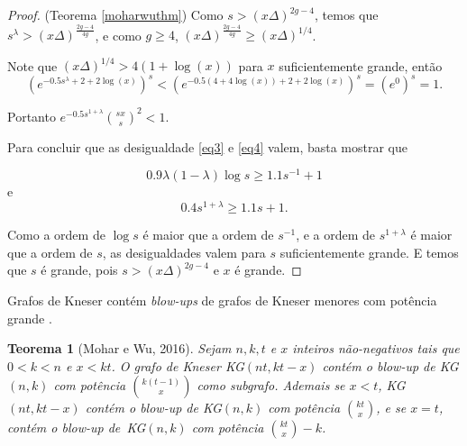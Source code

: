 \documentclass{article}
\newtheorem{teorema}{Teorema}[section]
\begin{document}
\begin{proof}{(Teorema \ref{moharwuthm})}
Como $s > (x\Delta)^{2g-4}$, temos que $s^\lambda > (x\Delta)^{\frac{2g-4}{4g}}$, e como $g \geq 4$, $(x\Delta)^{\frac{2g-4}{4g}} \geq (x\Delta)^{1/4}$. 

Note que $(x\Delta)^{1/4} > 4(1+\log(x))$ para $x$ suficientemente grande, então \[\left(e^{-0.5s^\lambda + 2 + 2\log(x)}\right)^s < \left(e^{-0.5(4+4\log(x)) + 2 + 2\log(x)}\right)^s = (e^0)^s = 1.\]

Portanto $e^{-0.5s^{1+\lambda}}\binom{sx}{s}^2 < 1$.

Para concluir que as desigualdade \ref{eq3} e \ref{eq4} valem, basta mostrar que

\[0.9\lambda(1-\lambda)\log s \geq 1.1s^{-1} + 1\]
e
\[0.4s^{1+\lambda}\geq 1.1s + 1.\]

Como a ordem de $\log s$ é maior que a ordem de $s^{-1}$, e a ordem de $s^{1+\lambda}$ é maior que a ordem de $s$, as desigualdades valem para $s$ suficientemente grande. E temos que $s$ é grande, pois $s > (x\Delta)^{2g-4}$ e $x$ é grande.
\end{proof}

Grafos de Kneser contém \textit{blow-ups} de grafos de Kneser menores com potência grande \cite{mohar2016dichromatic}.

\begin{teorema}[Mohar e Wu, 2016]\label{moharwukn}
Sejam $n,k,t$ e $x$ inteiros não-negativos tais que $0 < k < n$ e $x < kt$. O grafo de Kneser KG$(nt, kt-x)$ contém o \textit{blow-up} de KG$(n,k)$ com potência $\binom{k(t-1)}{x}$ como subgrafo. Ademais se $x < t$, KG$(nt, kt-x)$ contém o \textit{blow-up} de KG$(n,k)$ com potência $\binom{kt}{x}$, e se $x = t$, contém o \textit{blow-up} de~KG$(n,k)$ com potência $\binom{kt}{x}-k$.
\end{teorema}
\end{document}
